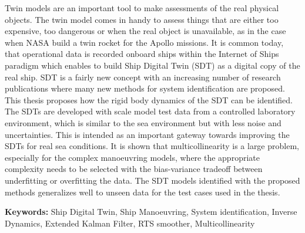 
Twin models are an important tool to make assessments of the real physical objects. The twin model comes in handy to assess things that are either too expensive, too dangerous or when the real object is unavailable, as in the case when NASA build a twin rocket for the Apollo missions. 
It is common today, that operational data is recorded onboard ships within the Internet of Ships paradigm which enables to build Ship Digital Twin (SDT) as a digital copy of the real ship. SDT is a fairly new concept with an increasing number of research publications where many new methods for system identification are proposed.
\noindent This thesis proposes how the rigid body dynamics of the SDT can be identified. 
\noindent The SDTs are developed with scale model test data from a controlled laboratory environment, which is similar to the sea environment but with less noise and uncertainties. This is intended as an important gateway towards improving the SDTs for real sea conditions. 
\noindent It is shown that multicollinearity is a large problem, especially for the complex manoeuvring models, where the appropriate complexity needs to be selected with the bias-variance tradeoff between underfitting or overfitting the data.
\noindent The SDT models identified with the proposed methods generalizes well to unseen data for the test cases used in the thesis.

\vspace{0.1cm}
\textbf{Keywords:} Ship Digital Twin, Ship Manoeuvring, System identification, Inverse Dynamics, Extended Kalman Filter, RTS smoother, Multicollinearity


